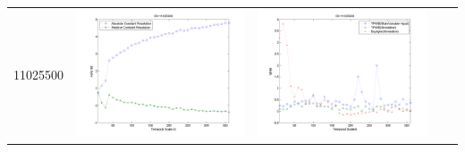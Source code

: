 \documentclass[11pt]{article}
\begin{document}
\begin{table}[H]
{\begin{tabular}{c  c   c   c c }
11025500&\begin{minipage}{.4\textwidth}\includegraphics[width=\linewidth]{resultgraph/11025500e.png}\end{minipage}
&\begin{minipage}{.4\textwidth}\includegraphics[width=\linewidth]{resultgraph/11025500MI.png}\end{minipage}

\end{tabular}}
\end{table}
\end{document}

